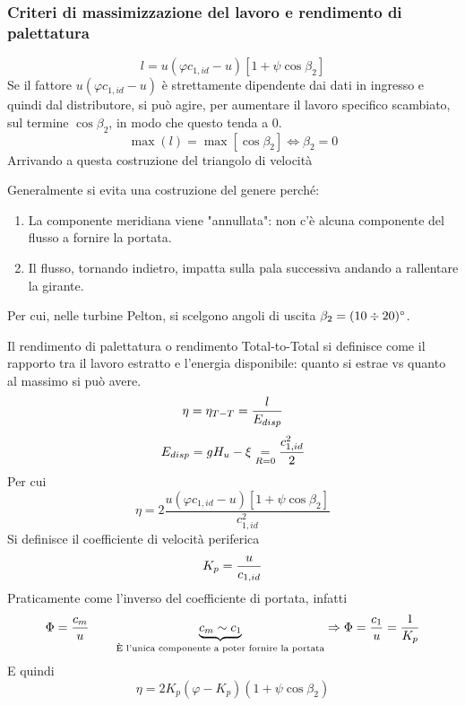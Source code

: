 \documentclass[a4paper, 15pt]{article}
\begin{document}
\subsubsection{Criteri di massimizzazione del lavoro e rendimento di palettatura}
\begin{adjustwidth}{2in}{}
	\[l = u(\varphi c_{1,id}-u)[1+\psi\cos\beta_2]\]
	Se il fattore $u(\varphi c_{1,id}-u)$ è strettamente dipendente dai dati in ingresso e quindi dal distributore, si può agire, per aumentare il lavoro specifico scambiato, sul termine $\cos\beta_2$, in modo che questo tenda a 0. 
	\[\max(l)=\max[\cos\beta_2]\Leftrightarrow\beta_2=0\]
	Arrivando a questa costruzione del triangolo di velocità
	

	Generalmente si evita una costruzione del genere perché:
	\begin{enumerate}
		\item La componente meridiana viene "annullata": non c'è alcuna componente del flusso a fornire la portata. 
		\item Il flusso, tornando indietro, impatta sulla pala successiva andando a rallentare la girante.
	\end{enumerate}
	Per cui, nelle turbine Pelton, si scelgono angoli di uscita $\beta_2 = (10\div20)\degree$. \newline 
	
	Il rendimento di palettatura o rendimento Total-to-Total si definisce come il rapporto tra il lavoro estratto e l'energia disponibile: quanto si estrae vs quanto al massimo si può avere.
	\[\eta = \eta_{T-T} = {l\over E_{disp}} \] 
	\[E_{disp} = gH_u-\xi \underset{R=0}{=} {c_{1,id}^2\over2}\]
	Per cui
	\[\eta = 2\dfrac{u(\varphi c_{1,id}-u)[1+\psi\cos\beta_2]}{c_{1,id}^2}\]
	Si definisce il coefficiente di velocità periferica
	\[K_p = {u\over c_{1,id}}\]
	Praticamente come l'inverso del coefficiente di portata, infatti
	\[\Phi = {c_m\over u} \qquad \underbrace{c_m \sim c_1}_{\text{È l'unica componente a poter fornire la portata}}  \Rightarrow \Phi = {c_1\over u} = {1\over K_p} \]
	E quindi
	\begin{equation}\label{eq:6}
		\eta = 2K_p(\varphi-K_p)(1+\psi\cos\beta_2)
	\end{equation}



\end{adjustwidth}
\end{document}
